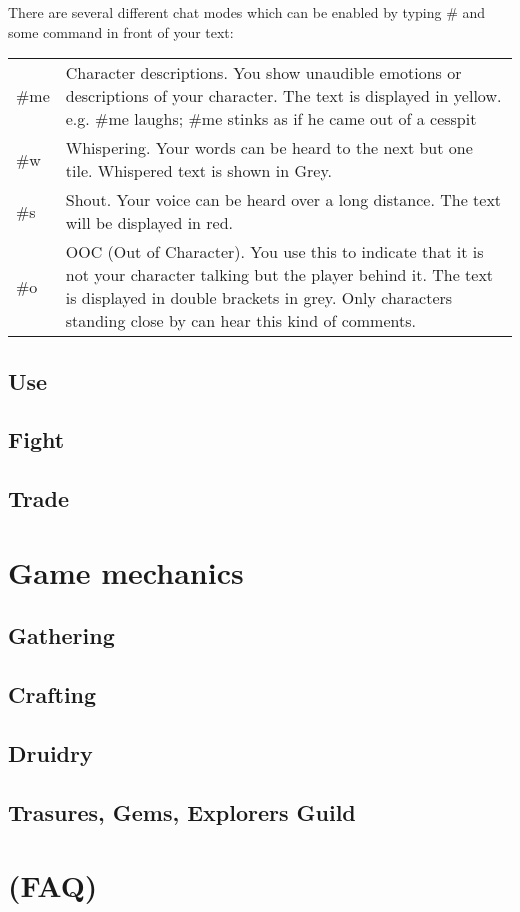 \documentclass[a4paper,11pt]{scrreprt}
\begin{document}
There are several different chat modes which can be enabled by typing \# and some command in front of your text:
\begin{table}[h]
\begin{tabular}{ l p{14.5cm}}
\#me & Character descriptions. 
You show unaudible emotions or descriptions of your character. The text is displayed in yellow. 
e.g.  \#me laughs; \#me stinks as if he came out of a cesspit \\
\#w & Whispering. Your words can be heard to the next but one tile. Whispered text is shown in Grey. \\
\#s & Shout. 
Your voice can be heard over a long distance. The text will be displayed in red. \\
\#o & OOC (Out of Character). 
You use this to indicate that it is not your character talking but the player behind it. The text 
is displayed in double brackets in grey. Only characters standing close by can hear this kind of comments.
\end{tabular}
\end{table}

\section{Use}
\section{Fight}
\section{Trade}

\chapter{Game mechanics}
\section{Gathering}
\section{Crafting}
\section{Druidry}
\section{Trasures, Gems, Explorers Guild}

\chapter{(FAQ)}
\end{document}
